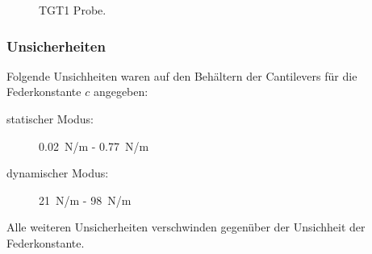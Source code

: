 \documentclass[
	a4paper,
	12pt,
	pagesize,
	ngerman
]{scrartcl}
\begin{document}
\begin{figure}[H]
			\caption{TGT1 Probe.}
\end{figure}

	\subsubsection{Unsicherheiten} %
	Folgende Unsichheiten waren auf den Behältern der Cantilevers für die Federkonstante $c$ angegeben:
	\begin{description}
		\item[statischer Modus:] \SI{0.02}{N/m} - \SI{0.77}{N/m} %
		\item[dynamischer Modus:] \SI{21}{N/m} - \SI{98}{N/m}
	\end{description}
	Alle weiteren Unsicherheiten verschwinden gegenüber der Unsichheit der Federkonstante.
\end{document}
